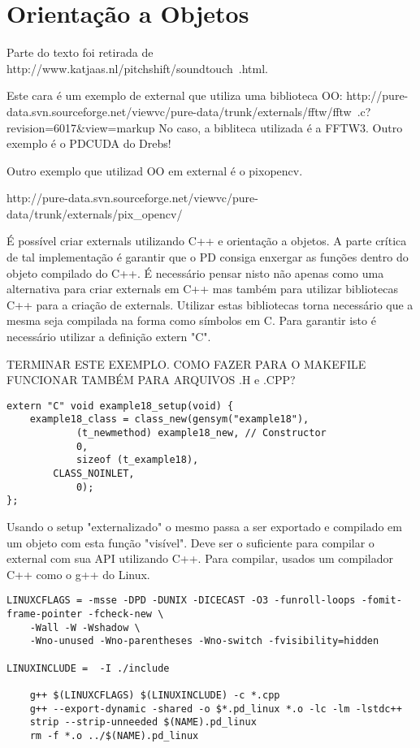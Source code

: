 
\chapter{Orientação a Objetos}

Parte do texto foi retirada de http://www.katjaas.nl/pitchshift/soundtouch~.html.

Este cara é um exemplo de external que utiliza uma biblioteca OO:
http://pure-data.svn.sourceforge.net/viewvc/pure-data/trunk/externals/fftw/fftw~.c?revision=6017&view=markup
No caso, a bibliteca utilizada é a FFTW3. Outro exemplo é o PDCUDA do Drebs!

Outro exemplo que utilizad OO em external é o pixopencv.

http://pure-data.svn.sourceforge.net/viewvc/pure-data/trunk/externals/pix_opencv/

É possível criar externals utilizando C++ e orientação a objetos. A parte crítica de tal implementação é garantir que o PD consiga enxergar as funções dentro do objeto compilado do C++. É necessário pensar nisto não apenas como uma alternativa para criar externals em C++ mas também para utilizar bibliotecas C++ para a criação de externals. Utilizar estas bibliotecas torna necessário que a mesma seja compilada na forma como símbolos em C. Para garantir isto é necessário utilizar a definição extern "C".

TERMINAR ESTE EXEMPLO. COMO FAZER PARA O MAKEFILE FUNCIONAR TAMBÉM PARA ARQUIVOS .H e .CPP?


\begin{lstlisting}
extern "C" void example18_setup(void) {
    example18_class = class_new(gensym("example18"),
            (t_newmethod) example18_new, // Constructor
            0,
            sizeof (t_example18),
	    CLASS_NOINLET,
            0);
};
\end{lstlisting}

Usando o setup "externalizado" o mesmo passa a ser exportado e compilado em um objeto com esta função "visível". Deve ser o suficiente para compilar o external com sua API utilizando C++. Para compilar, usados um compilador C++ como o g++ do Linux.

\begin{lstlisting}
LINUXCFLAGS = -msse -DPD -DUNIX -DICECAST -O3 -funroll-loops -fomit-frame-pointer -fcheck-new \
    -Wall -W -Wshadow \
    -Wno-unused -Wno-parentheses -Wno-switch -fvisibility=hidden

LINUXINCLUDE =  -I ./include

	g++ $(LINUXCFLAGS) $(LINUXINCLUDE) -c *.cpp 
	g++ --export-dynamic -shared -o $*.pd_linux *.o -lc -lm -lstdc++ 
	strip --strip-unneeded $(NAME).pd_linux
	rm -f *.o ../$(NAME).pd_linux
\end{lstlisting}


